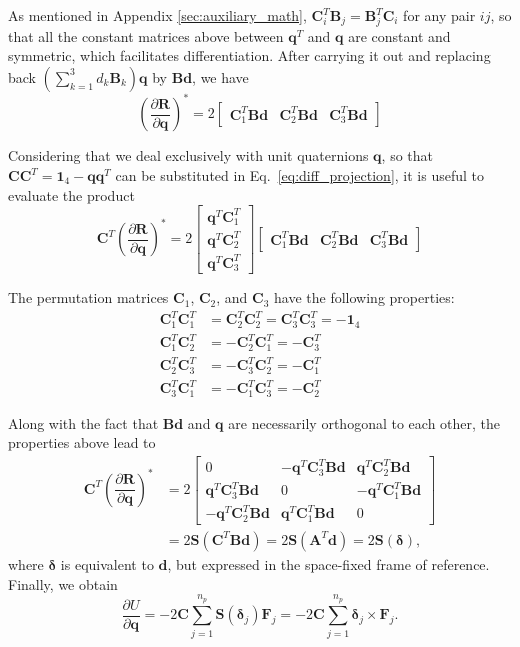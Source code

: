 \documentclass[aip,jcp,reprint,amsmath,amssymb]{revtex4-1}
\newcommand{\mt}[1]{\boldsymbol{\mathbf{#1}}}           %
\newcommand{\vt}[1]{\boldsymbol{\mathbf{#1}}}           %
\newcommand{\tr}[1]{#1^T}                               %
\newcommand{\diff}[2]{\dfrac{\partial #1}{\partial #2}} %
\begin{document}
As mentioned in Appendix \ref{sec:auxiliary_math}, $\tr{\mt C}_i \mt B_j = \tr{\mt B}_j \mt C_i$ for any pair $ij$, so that all the constant matrices above between $\tr{\vt q}$ and $\vt q$ are constant and symmetric, which facilitates differentiation. After carrying it out and replacing back $(\sum_{k=1}^3 d_k \mt B_k) \vt q$ by $\mt B \vt d$, we have
\[
\left( \diff{\vt R}{\vt q} \right)^\ast = 2 \left[\begin{array}{ccc}
\tr{\mt C}_1 \mt B \vt d & \tr{\mt C}_2 \mt B \vt d & \tr{\mt C}_3 \mt B \vt d
\end{array}\right]
\]

Considering that we deal exclusively with unit quaternions $\vt q$, so that $\mt C \tr{\mt C} = \mt 1_4 - \vt q \tr{\vt q}$ can be substituted in Eq.~\ref{eq:diff_projection}, it is useful to evaluate the product
\[
\tr{\mt C} \left( \diff{\vt R}{\vt q} \right)^\ast = 2 \left[\begin{array}{c}
\tr{\vt q}\tr{\mt C_1} \\
\tr{\vt q}\tr{\mt C_2} \\
\tr{\vt q}\tr{\mt C_3}
\end{array}\right] \left[\begin{array}{ccc}
\tr{\mt C}_1 \mt B \vt d & \tr{\mt C}_2 \mt B \vt d & \tr{\mt C}_3 \mt B \vt d
\end{array}\right]
\]

The permutation matrices $\mt C_1$, $\mt C_2$, and $\mt C_3$ have the following properties:
\begin{equation}
\begin{aligned}
\tr{\mt C_1}\tr{\mt C_1} &= \tr{\mt C_2}\tr{\mt C_2} = \tr{\mt C_3}\tr{\mt C_3} = -\mt 1_4 \\
\tr{\mt C_1}\tr{\mt C_2} &= -\tr{\mt C_2}\tr{\mt C_1} = -\tr{\mt C_3} \\
\tr{\mt C_2}\tr{\mt C_3} &= -\tr{\mt C_3}\tr{\mt C_2} = -\tr{\mt C_1} \\
\tr{\mt C_3}\tr{\mt C_1} &= -\tr{\mt C_1}\tr{\mt C_3} = -\tr{\mt C_2}
\end{aligned}
\end{equation}

Along with the fact that $\mt B\vt d$ and $\vt q$ are necessarily orthogonal to each other, the properties above lead to
\begin{align*}
\tr{\mt C} \left( \diff{\vt R}{\vt q} \right)^\ast &= 2 \left[\begin{array}{ccc}
0 & -\tr{\vt q}\tr{\mt C}_3 \mt B \vt d & \tr{\vt q}\tr{\mt C}_2 \mt B \vt d \\
\tr{\vt q}\tr{\mt C}_3 \mt B \vt d & 0 & -\tr{\vt q}\tr{\mt C}_1 \mt B \vt d \\
-\tr{\vt q}\tr{\mt C}_2 \mt B \vt d & \tr{\vt q}\tr{\mt C}_1 \mt B \vt d & 0
\end{array}\right] \\
&= 2 \mt S(\tr{\mt C} \mt B \vt d) = 2 \mt S(\tr{\mt A}\vt d) = 2 \mt S(\vt \delta),
\end{align*}
where $\vt \delta$ is equivalent to $\vt d$, but expressed in the space-fixed frame of reference. Finally, we obtain
\[
\diff{U}{\vt q} = - 2 \mt C \sum_{j=1}^{n_p} \mt S(\vt \delta_j) {\vt F_j}  = - 2 \mt C \sum_{j=1}^{n_p} \vt \delta_j \times {\vt F_j}.
\]



\end{document}
